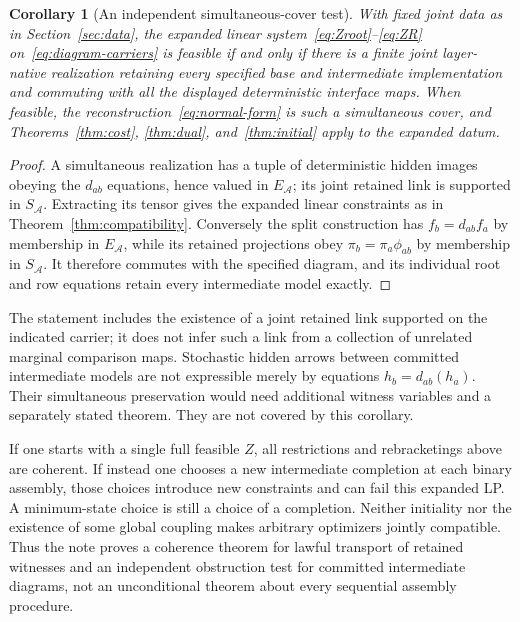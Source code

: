 \documentclass[11pt]{article}
\newtheorem{corollary}[theorem]{Corollary}
\theoremstyle{remark}
\begin{document}
\begin{corollary}[An independent simultaneous-cover test]\label{cor:intermediate}
With fixed joint data as in Section~\ref{sec:data}, the expanded linear system~\eqref{eq:Zroot}--\eqref{eq:ZR} on~\eqref{eq:diagram-carriers} is feasible if and only if there is a finite joint layer-native realization retaining every specified base and intermediate implementation and commuting with all the displayed deterministic interface maps. When feasible, the reconstruction~\eqref{eq:normal-form} is such a simultaneous cover, and Theorems~\ref{thm:cost}, \ref{thm:dual}, and~\ref{thm:initial} apply to the expanded datum.
\end{corollary}
\begin{proof}
A simultaneous realization has a tuple of deterministic hidden images obeying the $d_{ab}$ equations, hence valued in $E_{\mathcal A}$; its joint retained link is supported in $S_{\mathcal A}$. Extracting its tensor gives the expanded linear constraints as in Theorem~\ref{thm:compatibility}. Conversely the split construction has $f_b=d_{ab}f_a$ by membership in $E_{\mathcal A}$, while its retained projections obey $\pi_b=\pi_a\phi_{ab}$ by membership in $S_{\mathcal A}$. It therefore commutes with the specified diagram, and its individual root and row equations retain every intermediate model exactly.
\end{proof}

The statement includes the existence of a joint retained link supported on the indicated carrier; it does not infer such a link from a collection of unrelated marginal comparison maps. Stochastic hidden arrows between committed intermediate models are not expressible merely by equations $h_b=d_{ab}(h_a)$. Their simultaneous preservation would need additional witness variables and a separately stated theorem. They are not covered by this corollary.

If one starts with a single full feasible $Z$, all restrictions and rebracketings above are coherent. If instead one chooses a new intermediate completion at each binary assembly, those choices introduce new constraints and can fail this expanded LP. A minimum-state choice is still a choice of a completion. Neither initiality nor the existence of some global coupling makes arbitrary optimizers jointly compatible. Thus the note proves a coherence theorem for lawful transport of retained witnesses and an independent obstruction test for committed intermediate diagrams, not an unconditional theorem about every sequential assembly procedure.
\end{document}
